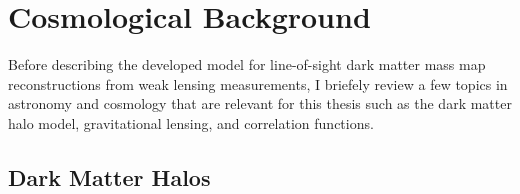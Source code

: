 \documentclass[%
 reprint,
 amsmath,amssymb,
 aps,nofootinbib
]{revtex4-1}
\begin{document}


\section{Cosmological Background} \label{background}

Before describing the developed model for line-of-sight dark matter mass map reconstructions from weak lensing measurements, I briefely review a few topics in astronomy and cosmology that are relevant for this thesis such as the dark matter halo model, gravitational lensing, and correlation functions.

\subsection{Dark Matter Halos} \label{halos}
\end{document}
